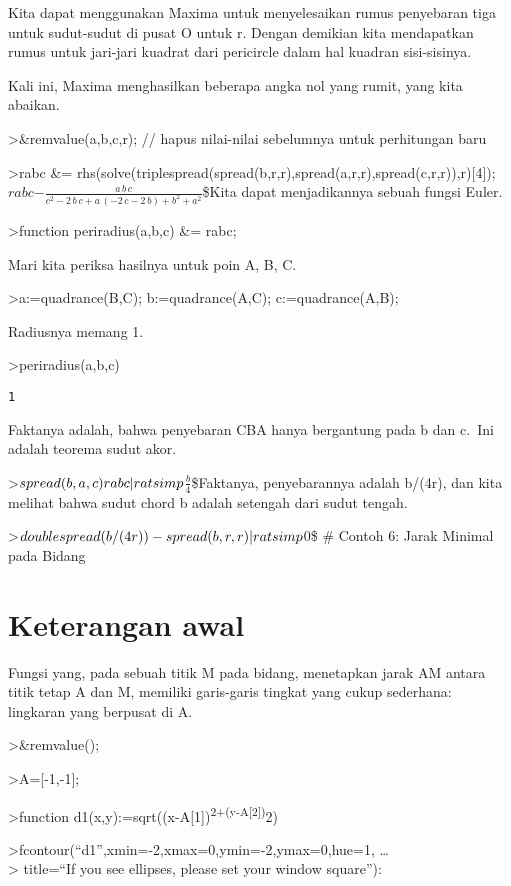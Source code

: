 \documentclass[
]{book}
\begin{document}
Kita dapat menggunakan Maxima untuk menyelesaikan rumus penyebaran tiga untuk sudut-sudut di pusat O untuk r. Dengan demikian kita mendapatkan rumus untuk jari-jari kuadrat dari pericircle dalam hal kuadran sisi-sisinya.

Kali ini, Maxima menghasilkan beberapa angka nol yang rumit, yang kita abaikan.

\textgreater\&remvalue(a,b,c,r); // hapus nilai-nilai sebelumnya untuk perhitungan baru

\textgreater rabc \&= rhs(solve(triplespread(spread(b,r,r),spread(a,r,r),spread(c,r,r)),r){[}4{]}); \(rabc\)\(-\frac{a\,b\,c}{c^2-2\,b\,c+a\,\left(-2\,c-2\,b\right)+b^2+a^2}\)\$Kita dapat menjadikannya sebuah fungsi Euler.

\textgreater function periradius(a,b,c) \&= rabc;

Mari kita periksa hasilnya untuk poin A, B, C.

\textgreater a:=quadrance(B,C); b:=quadrance(A,C); c:=quadrance(A,B);

Radiusnya memang 1.

\textgreater periradius(a,b,c)

\begin{verbatim}
1
\end{verbatim}

Faktanya adalah, bahwa penyebaran CBA hanya bergantung pada b dan c.~Ini adalah teorema sudut akor.

\textgreater{}\(spread(b,a,c)\*rabc | ratsimp\)\(\frac{b}{4}\)\$Faktanya, penyebarannya adalah b/(4r), dan kita melihat bahwa sudut chord b adalah setengah dari sudut tengah.

\textgreater{}\(doublespread(b/(4\*r))-spread(b,r,r) | ratsimp\)\(0\)\$ \# Contoh 6: Jarak Minimal pada Bidang

\section{Keterangan awal}\label{keterangan-awal}

Fungsi yang, pada sebuah titik M pada bidang, menetapkan jarak AM antara titik tetap A dan M, memiliki garis-garis tingkat yang cukup sederhana: lingkaran yang berpusat di A.

\textgreater\&remvalue();

\textgreater A={[}-1,-1{]};

\textgreater function d1(x,y):=sqrt((x-A{[}1{]})\textsuperscript{2+(y-A{[}2{]})}2)

\textgreater fcontour(``d1'',xmin=-2,xmax=0,ymin=-2,ymax=0,hue=1, \ldots{}\\
\textgreater{} title=``If you see ellipses, please set your window square''):
\end{document}
